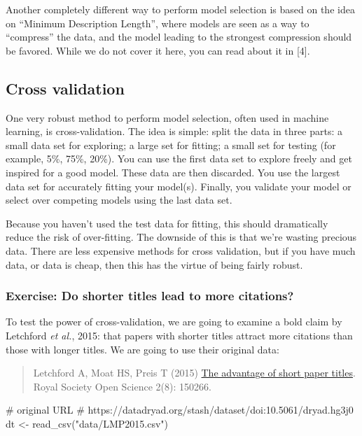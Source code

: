 \documentclass[
  letterpaper,
  DIV=11,
  numbers=noendperiod]{scrreprt}
\newenvironment{Shaded}{\begin{snugshade}}{\end{snugshade}}
\newcommand{\NormalTok}[1]{\textcolor[rgb]{0.00,0.23,0.31}{#1}}
\begin{document}
Another completely different way to perform model selection is based on
the idea on ``Minimum Description Length'', where models are seen as a
way to ``compress'' the data, and the model leading to the strongest
compression should be favored. While we do not cover it here, you can
read about it in {[}4{]}.

\subsection{Cross validation}\label{cross-validation}

One very robust method to perform model selection, often used in machine
learning, is cross-validation. The idea is simple: split the data in
three parts: a small data set for exploring; a large set for fitting; a
small set for testing (for example, 5\%, 75\%, 20\%). You can use the
first data set to explore freely and get inspired for a good model.
These data are then discarded. You use the largest data set for
accurately fitting your model(s). Finally, you validate your model or
select over competing models using the last data set.

Because you haven't used the test data for fitting, this should
dramatically reduce the risk of over-fitting. The downside of this is
that we're wasting precious data. There are less expensive methods for
cross validation, but if you have much data, or data is cheap, then this
has the virtue of being fairly robust.

\subsubsection{Exercise: Do shorter titles lead to more
citations?}\label{exercise-do-shorter-titles-lead-to-more-citations}

To test the power of cross-validation, we are going to examine a bold
claim by Letchford \emph{et al.}, 2015: that papers with shorter titles
attract more citations than those with longer titles. We are going to
use their original data:

\begin{quote}
Letchford A, Moat HS, Preis T (2015)
\href{https://doi.org/10.1098/rsos.150266}{The advantage of short paper
titles}. Royal Society Open Science 2(8): 150266.
\end{quote}

\begin{Shaded}
\begin{Highlighting}[]
\NormalTok{\# original URL}
\NormalTok{\# https://datadryad.org/stash/dataset/doi:10.5061/dryad.hg3j0}
\NormalTok{dt \textless{}{-} read\_csv("data/LMP2015.csv")}
\end{Highlighting}
\end{Shaded}
\end{document}
